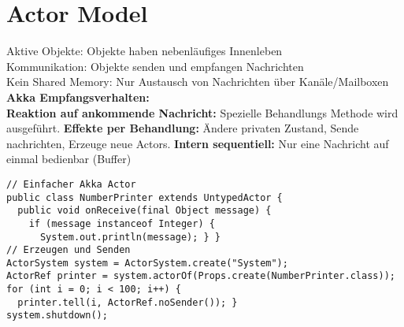 
\section{Actor Model}
\textcolor{b}{Aktive Objekte:} Objekte haben nebenläufiges Innenleben\\
\textcolor{b}{Kommunikation:} Objekte senden und empfangen Nachrichten\\
\textcolor{b}{Kein Shared Memory:} Nur Austausch von Nachrichten über Kanäle/Mailboxen\\
\textcolor{b}{\textbf{Akka Empfangsverhalten:}}\\
\textbf{Reaktion auf ankommende Nachricht:} Spezielle Behandlungs Methode wird ausgeführt. \textbf{Effekte per Behandlung:} Ändere privaten Zustand, Sende nachrichten, Erzeuge neue Actors. \textbf{Intern sequentiell:} Nur eine Nachricht auf einmal bedienbar (Buffer)
\begin{lstlisting}
// Einfacher Akka Actor
public class NumberPrinter extends UntypedActor {
  public void onReceive(final Object message) {
    if (message instanceof Integer) {
      System.out.println(message); } }
// Erzeugen und Senden
ActorSystem system = ActorSystem.create("System");
ActorRef printer = system.actorOf(Props.create(NumberPrinter.class));
for (int i = 0; i < 100; i++) {
  printer.tell(i, ActorRef.noSender()); }
system.shutdown();
\end{lstlisting}
